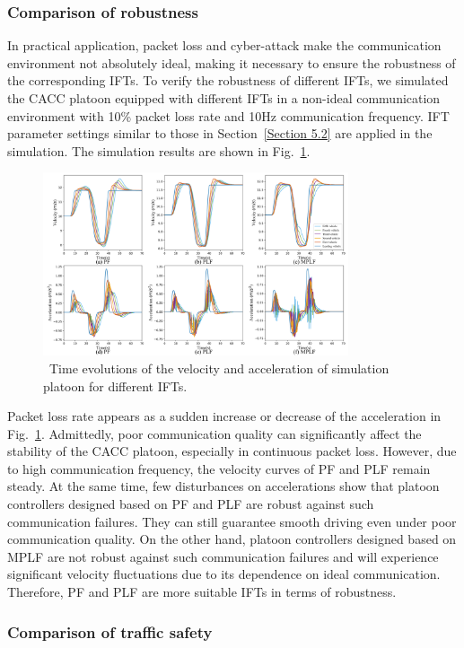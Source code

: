 \documentclass[journal]{IEEEtran}
\begin{document}
\subsubsection{Comparison of robustness}

In practical application, packet loss and cyber-attack make the communication environment not absolutely ideal, making it necessary to ensure the robustness of the corresponding IFTs. To verify the robustness of different IFTs, we simulated the CACC platoon equipped with different IFTs in a non-ideal communication environment with 10\% packet loss rate and 10Hz communication frequency. IFT parameter settings similar to those in Section~\ref{Section 5.2} are applied in the simulation. The simulation results are shown in Fig.~\ref{Figure7}.

\begin{figure}
\includegraphics[width=9cm]{fig7.png}
\caption{~Time evolutions of the velocity and acceleration of simulation platoon for different IFTs.} 
\label{Figure7}
\end{figure}

Packet loss rate appears as a sudden increase or decrease of the acceleration in Fig.~\ref{Figure7}. Admittedly, poor communication quality can significantly affect the stability of the CACC platoon, especially in continuous packet loss. However, due to high communication frequency, the velocity curves of PF and PLF remain steady. At the same time, few disturbances on accelerations show that platoon controllers designed based on PF and PLF are robust against such communication failures. They can still guarantee smooth driving even under poor communication quality. On the other hand, platoon controllers designed based on MPLF are not robust against such communication failures and will experience significant velocity fluctuations due to its dependence on ideal communication. Therefore, PF and PLF are more suitable IFTs in terms of robustness.


\subsubsection{Comparison of traffic safety}
\end{document}
